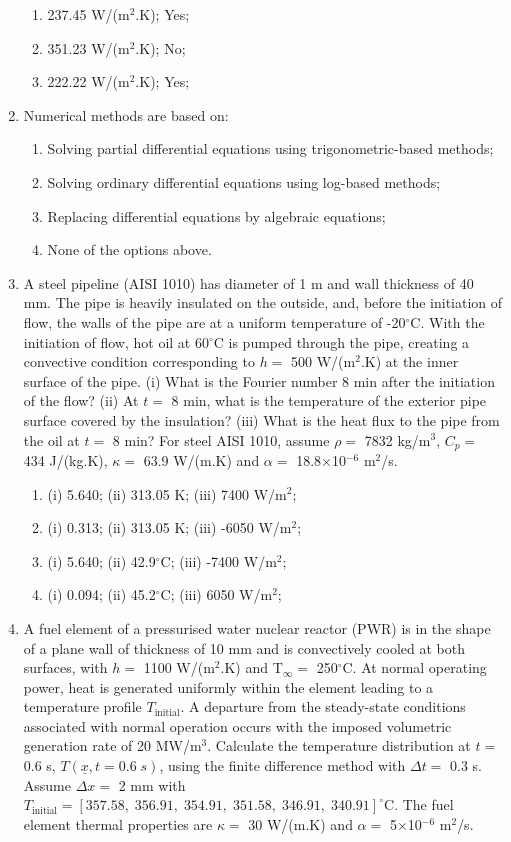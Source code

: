 \documentclass[12pts,a4paper,amsmath,amssymb,floatfix]{article}%
\begin{document}
\begin{enumerate}
\begin{enumerate}
   \item 237.45 W/(m$^{2}$.K); Yes;
   \item 351.23 W/(m$^{2}$.K); No;
   \item 222.22 W/(m$^{2}$.K); Yes; %
\end{enumerate}
%
\item Numerical methods are based on:
\begin{enumerate}
   \item Solving partial differential equations using trigonometric-based methods;
   \item Solving ordinary differential equations using log-based methods;
   \item Replacing differential equations by algebraic equations; %
   \item None of the options above.
\end{enumerate}
%
\item A steel pipeline (AISI 1010) has diameter of 1 m and wall thickness of 40 mm. The pipe is heavily insulated on the outside, and, before the initiation of flow, the walls of the pipe are at a uniform temperature of -20$^{\circ}$C. With the initiation of flow, hot oil at 60$^{\circ}$C is pumped through the pipe, creating a convective condition corresponding to $h=$ 500 W/(m$^{2}$.K) at the inner surface of the pipe. (i) What is the Fourier number 8 min after the initiation of the flow? (ii) At $t=$ 8 min, what is the temperature of the exterior pipe surface covered by the insulation? (iii) What is the heat flux to the pipe from the oil at $t=$ 8 min? For steel AISI 1010, assume $\rho=$ 7832 kg/m$^{3}$, $C_{p}=$ 434 J/(kg.K), $\kappa=$ 63.9 W/(m.K) and $\alpha=$ 18.8$\times$10$^{-6}$ m$^{2}$/s. %
\begin{enumerate}
   \item (i) 5.640; (ii) 313.05 K;      (iii)  7400 W/m$^{2}$;
   \item (i) 0.313; (ii) 313.05 K;      (iii) -6050 W/m$^{2}$;
   \item (i) 5.640; (ii) 42.9$^{\circ}$C; (iii) -7400 W/m$^{2}$; %
   \item (i) 0.094; (ii) 45.2$^{\circ}$C; (iii)  6050 W/m$^{2}$;
\end{enumerate}
%
\item A fuel element of a pressurised water nuclear reactor (PWR) is in the shape of a plane wall of thickness of 10 mm and is convectively cooled at both surfaces, with $h=$ 1100 W/(m$^{2}$.K) and T$_{\infty}=$ 250$^{\circ}$C. At normal operating power, heat is generated uniformly within the element leading to a temperature profile $T_{\text{initial}}$. A departure from the steady-state conditions associated with normal operation occurs with the imposed volumetric generation rate of 20 MW/m$^{3}$. Calculate the temperature distribution at $t=$ 0.6 s, $T\left(\underline{x},t=0.6\;s\right)$, using the finite difference method with $\Delta t=$ 0.3 s. Assume $\Delta x=$ 2 mm with $T_{\text{initial}}=\left[357.58,\; 356.91,\; 354.91,\; 351.58,\; 346.91,\; 340.91\right]^{\circ}$C. The fuel element thermal properties are $\kappa=$ 30 W/(m.K) and $\alpha=$ 5$\times$10$^{-6}$ m$^{2}$/s. %

\end{enumerate}
\end{document}
